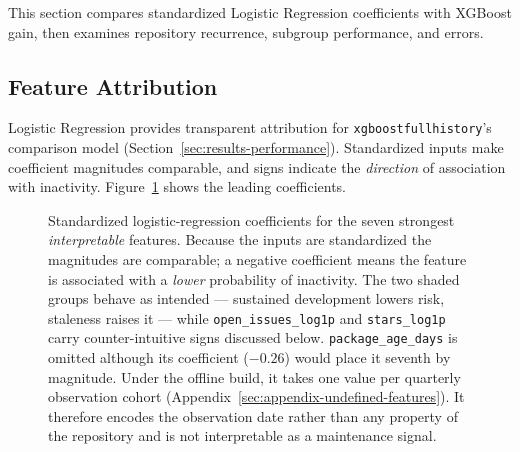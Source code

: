 This section compares standardized Logistic Regression coefficients with
XGBoost gain, then examines repository recurrence, subgroup performance, and
errors.

\subsection{Feature Attribution}
\label{sec:results-attribution}

Logistic Regression provides transparent attribution for
\texttt{xgboost\sdash full\sdash history}'s comparison model
(Section~\ref{sec:results-performance}). Standardized inputs make coefficient
magnitudes comparable, and signs indicate the \emph{direction} of association
with inactivity.
Figure~\ref{fig:attribution} shows the leading coefficients.

\begin{figure}[htbp]
\centering
{}
\caption[Standardized logistic-regression coefficients]{Standardized
logistic-regression coefficients for the seven strongest \emph{interpretable}
features. Because the inputs are standardized the magnitudes are comparable; a
negative coefficient means the feature is associated with a \emph{lower}
probability of inactivity. The two shaded groups behave as intended --- sustained
development lowers risk, staleness raises it --- while \texttt{open\_issues\_log1p}
and \texttt{stars\_log1p} carry counter-intuitive signs discussed below.
\texttt{package\_age\_days} is omitted although its coefficient (\(-0.26\)) would
place it seventh by magnitude. Under the offline build, it takes one value per
quarterly observation cohort (Appendix~\ref{sec:appendix-undefined-features}).
It therefore encodes the observation date rather than any property of the
repository and is not interpretable as a maintenance signal.}
\label{fig:attribution}
\end{figure}

